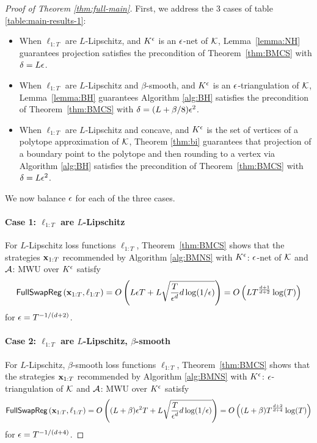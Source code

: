 \begin{proof}[Proof of Theorem \ref{thm:full-main}]
    First, we address the 3 cases of table \ref{table:main-results-1}:

    \begin{itemize}
        \item When $\ell_{1:T}$ are $L$-Lipschitz, and $K^{\epsilon}$ is an $\epsilon$-net of $\mathcal{K}$, Lemma~\ref{lemma:NH} guarantees projection satisfies the precondition of Theorem~\ref{thm:BMCS} with $\delta = L\epsilon$.
        \item When $\ell_{1:T}$ are $L$-Lipschitz and $\beta$-smooth, and $K^{\epsilon}$ is an $\epsilon$-triangulation of $\mathcal{K}$, Lemma~\ref{lemma:BH} guarantees Algorithm \ref{alg:BH} satisfies the precondition of Theorem~\ref{thm:BMCS} with $\delta = (L+\beta/8)\epsilon^2$.
        \item When $\ell_{1:T}$ are $L$-Lipschitz and concave, and $K^{\epsilon}$ is the set of vertices of a polytope approximation of $\mathcal{K}$, Theorem \ref{thm:bi} guarantees that projection of a boundary point to the polytope and then rounding to a vertex via Algorithm \ref{alg:BH} satisfies the precondition of Theorem~\ref{thm:BMCS} with $\delta = L\epsilon^2$.
    \end{itemize}
    
We now balance $\epsilon$ for each of the three cases.
    \paragraph{Case 1: $\ell_{1:T}$ are $L$-Lipschitz}

    For $L$-Lipschitz loss functions $\ell_{1:T}$, Theorem~\ref{thm:BMCS} shows that the strategies $\mathbf{x}_{1:T}$ recommended by Algorithm \ref{alg:BMNS} with $K^{\epsilon}$: $\epsilon$-net of $\mathcal{K}$ and $\mathcal{A}$: MWU over $K^{\epsilon}$ satisfy
    \begin{equation*}
        \mathsf{FullSwapReg}\left(\mathbf{x}_{1:T},\ell_{1:T}\right) = O\left(L \epsilon T + L\sqrt{\frac{T}{\epsilon^d}d\log(1/\epsilon)}\right) = O\left(LT^{\frac{d+1}{d+2}}\log(T)\right)
    \end{equation*}
    for $\epsilon = T^{-1/(d+2)}$.

    \paragraph{Case 2: $\ell_{1:T}$ are $L$-Lipschitz, $\beta$-smooth}

    For $L$-Lipschitz, $\beta$-smooth loss functions $\ell_{1:T}$, Theorem~\ref{thm:BMCS} shows that the strategies $\mathbf{x}_{1:T}$ recommended by Algorithm \ref{alg:BMNS} with $K^{\epsilon}$: $\epsilon$-triangulation of $\mathcal{K}$ and $\mathcal{A}$: MWU over $K^{\epsilon}$ satisfy
    \begin{equation*}
        \mathsf{FullSwapReg}\left(\mathbf{x}_{1:T},\ell_{1:T}\right) = O\left((L+\beta) \epsilon^2 T + L\sqrt{\frac{T}{\epsilon^d}d\log(1/\epsilon)}\right) = O\left((L+\beta)T^{\frac{d+2}{d+4}}\log(T)\right)
    \end{equation*}
    for $\epsilon = T^{-1/(d+4)}$.


\end{proof}
